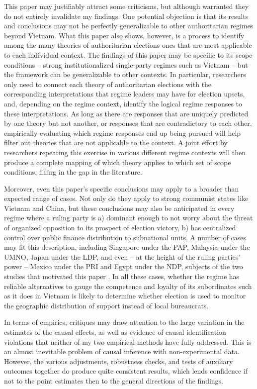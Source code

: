 \documentclass[12pt]{article}\usepackage[]{graphicx}\usepackage[]{color}
\newcommand{\1}{\mathbbm{1}}
\begin{document}
This paper may justifiably attract some criticisms, but although warranted they do not entirely invalidate my findings. One potential objection is that its results and conclusions may not be perfectly generalizable to other authoritarian regimes beyond Vietnam. What this paper also shows, however, is a process to identify among the many theories of authoritarian elections ones that are most applicable to each individual context. The findings of this paper may be specific to its scope conditions -- strong institutionalized single-party regimes such as Vietnam -- but the framework can be generalizable to other contexts. In particular, researchers only need to connect each theory of authoritarian elections with the corresponding interpretations that regime leaders may have for election upsets, and, depending on the regime context, identify the logical regime responses to these interpretations. As long as there are responses that are uniquely predicted by one theory but not another, or responses that are contradictory to each other, empirically evaluating which regime responses end up being pursued will help filter out theories that are not applicable to the context. A joint effort by researchers repeating this exercise in various different regime contexts will then produce a complete mapping of which theory applies to which set of scope conditions, filling in the gap in the literature.

Moreover, even this paper's specific conclusions may apply to a broader than expected range of cases. Not only do they apply to strong communist states like Vietnam and China, but these conclusions may also be anticipated in every regime where a ruling party is a) dominant enough to not worry about the threat of organized opposition to its prospect of election victory, b) has centralized control over public finance distribution to subnational units. A number of cases may fit this description, including Singapore under the PAP, Malaysia under the UMNO, Japan under the LDP, and even -- at the height of the ruling parties' power -- Mexico under the PRI and Egypt under the NDP, subjects of the two studies that motivated this paper \citep{Magaloni2006, Blaydes2008}. In all these cases, whether the regime has reliable alternatives to gauge the competence and loyalty of its subordinates such as it does in Vietnam is likely to determine whether election is used to monitor the geographic distribution of support instead of local bureaucrats.

In terms of empirics, critiques may draw attention to the large variation in the estimates of the causal effects, as well as evidence of causal identification violations that neither of my two empirical methods have fully addressed. This is an almost inevitable problem of causal inference with non-experimental data. However, the various adjustments, robustness checks, and tests of auxiliary outcomes together do produce quite consistent results, which lends confidence if not to the point estimates then to the general directions of the findings.
\end{document}
